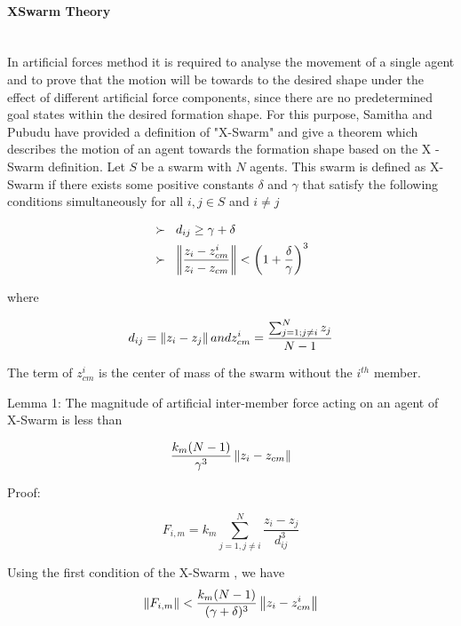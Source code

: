 \paragraph{XSwarm Theory}\hspace{0pt} \\
In artificial forces method it is required to analyse the movement of a single agent and to prove that the motion will be towards to the desired shape under the effect of different artificial force components, since there are no predetermined goal states within the desired formation shape. For this purpose, Samitha and Pubudu \cite{17} have provided a definition of "X-Swarm" and give a theorem which describes the motion of an agent towards the formation shape based on the X -Swarm definition. Let $S$ be a swarm with $N$ agents. This swarm is defined as X-Swarm if there exists some positive constants $\delta$ and  $ \gamma$ that satisfy the following conditions simultaneously for all $i,j \in S$ and $i \neq j$
			
\begin{align}
\begin{split}
&\succ\hspace{0.2cm}  d_{ij} \geq \gamma + \delta \\
&\succ \hspace{0.2cm}   \left\lVert\frac{z_i - z_{cm}^i}{z_i - z_{cm}}\right\rVert < \left(1+\frac{\delta}{\gamma}\right)^3
\end{split}
\end{align}

where

\begin{equation}
 d_{ij} = \left\lVert z_i - z_j\right\rVert and z_{cm}^i = \frac{\sum_{j=1; j\neq i}^{N} z_j}{N-1}
\end{equation}

The term of $z_{cm}^i$ is the center of mass of the swarm without the $i^{th}$ member.

Lemma 1: The magnitude of artificial inter-member force acting on an agent of X-Swarm  is less than

\begin{equation}
\frac{k_m(N-1)}{\gamma ^3} \left\lVert z_i - z_{cm}\right\rVert
\end{equation}

Proof:

\begin{equation}
F_{i,m} = k_m \sum_{j=1, j \neq i}^{N} \frac{z_i - z_j}{d_{ij}^3} 
\end{equation}

Using the first condition of the X-Swarm , we have
\begin{equation}
\left\lVert F_{i,m}\right\rVert < \frac{k_m(N-1)}{(\gamma + \delta)^3} \left\lVert z_i - z_{cm}^i\right\rVert
\end{equation}

